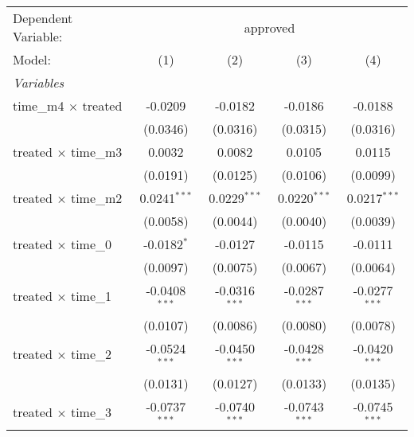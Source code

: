 \begingroup
\centering
\begin{tabular}{lcccc}
   \tabularnewline \midrule \midrule
   Dependent Variable: & \multicolumn{4}{c}{approved}\\
   Model:                                              & (1)             & (2)             & (3)             & (4)\\  
   \midrule
   \emph{Variables}\\
   time\_m4 $\times$ treated                           & -0.0209         & -0.0182         & -0.0186         & -0.0188\\   
                                                       & (0.0346)        & (0.0316)        & (0.0315)        & (0.0316)\\   
   treated $\times$ time\_m3                           & 0.0032          & 0.0082          & 0.0105          & 0.0115\\   
                                                       & (0.0191)        & (0.0125)        & (0.0106)        & (0.0099)\\   
   treated $\times$ time\_m2                           & 0.0241$^{***}$  & 0.0229$^{***}$  & 0.0220$^{***}$  & 0.0217$^{***}$\\   
                                                       & (0.0058)        & (0.0044)        & (0.0040)        & (0.0039)\\   
   treated $\times$ time\_0                            & -0.0182$^{*}$   & -0.0127         & -0.0115         & -0.0111\\   
                                                       & (0.0097)        & (0.0075)        & (0.0067)        & (0.0064)\\   
   treated $\times$ time\_1                            & -0.0408$^{***}$ & -0.0316$^{***}$ & -0.0287$^{***}$ & -0.0277$^{***}$\\   
                                                       & (0.0107)        & (0.0086)        & (0.0080)        & (0.0078)\\   
   treated $\times$ time\_2                            & -0.0524$^{***}$ & -0.0450$^{***}$ & -0.0428$^{***}$ & -0.0420$^{***}$\\   
                                                       & (0.0131)        & (0.0127)        & (0.0133)        & (0.0135)\\   
   treated $\times$ time\_3                            & -0.0737$^{***}$ & -0.0740$^{***}$ & -0.0743$^{***}$ & -0.0745$^{***}$\\   

\end{tabular}
